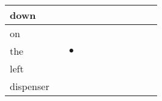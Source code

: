 \documentclass[landscape]{article}
\newcommand{\ssp}{\hspace{2pt}}
\newcommand{\mex}{\cellcolor{g}$\bullet$}
\begin{document}
\begin{tabular}{|l|p{10pt}|p{10pt}|p{10pt}|p{10pt}|p{10pt}|p{10pt}|p{10pt}|p{10pt}|p{10pt}|p{10pt}|}
\hline
\ssp down \ssp&\hspace{2pt}&\hspace{2pt}&\hspace{2pt}&\hspace{2pt}&\hspace{2pt}&\hspace{2pt}&\hspace{2pt}&\hspace{2pt}&\hspace{2pt}&\hspace{2pt}\\
\hline
\ssp on \ssp&\hspace{2pt}&\hspace{2pt}&\hspace{2pt}&\hspace{2pt}&\hspace{2pt}&\hspace{2pt}&\hspace{2pt}&\hspace{2pt}&\hspace{2pt}&\hspace{2pt}\\
\hline
\ssp \cellcolor{ref1}the \ssp&\hspace{2pt}&\hspace{2pt}\mex&\hspace{2pt}&\hspace{2pt}&\hspace{2pt}&\hspace{2pt}&\hspace{2pt}&\hspace{2pt}&\hspace{2pt}&\hspace{2pt}\\
\hline
\ssp left \ssp&\hspace{2pt}&\hspace{2pt}&\hspace{2pt}&\hspace{2pt}&\hspace{2pt}&\hspace{2pt}&\hspace{2pt}&\hspace{2pt}&\hspace{2pt}&\hspace{2pt}\\
\hline
\ssp dispenser \ssp&\hspace{2pt}&\hspace{2pt}&\hspace{2pt}&\hspace{2pt}&\hspace{2pt}&\hspace{2pt}&\hspace{2pt}&\hspace{2pt}&\hspace{2pt}&\hspace{2pt}\\

\end{tabular}
\end{document}
